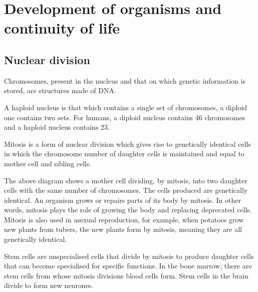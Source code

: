 \section{Development of organisms and continuity of life}
\subsection{Nuclear division}

Chromosomes, present in the nucleus and that on which genetic information is stored, are structures
made of DNA.

A haploid nucleus is that which contains a single set of chromosomes, a diploid one contains two
sets. For humans, a diploid nucleus contains 46 chromosomes and a haploid nucleus contains 23.

Mitosis is a form of nuclear division which gives rise to genetically identical cells in which
the chromosome number of daughter cells is maintained and equal to mother cell and sibling cells.

\begin{center}
\end{center}
The above diagram shows a mother cell dividing, by mitosis, into two daughter cells with the same
number of chromosomes. The cells produced are genetically identical. An organism grows or repairs
parts of its body by mitosis. In other words, mitosis plays the role of growing the body and 
replacing deprecated cells. Mitosis is also used in asexual reproduction, for example, when
potatoes grow new plants from tubers, the new plants form by mitosis, meaning they are all 
genetically identical.

Stem cells are unspecialised cells that divide by mitosis to produce daughter cells that can become
specialised for specific functions. In the bone marrow, there are stem cells from whose mitosis
divisions blood cells form. Stem cells in the brain divide to form new neurones.

